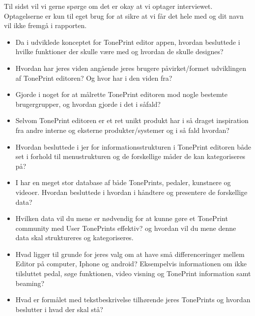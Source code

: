 Til sidst vil vi gerne spørge om det er okay at vi optager interviewet. Optagelserne er kun til eget brug for at sikre at vi får det hele med og dit navn vil ikke fremgå i rapporten.


\begin{itemize}
  \item Da i udviklede konceptet for TonePrint editor appen, hvordan besluttede i hvilke funktioner der skulle være med og hvordan de skulle designes?
  \item Hvordan har jeres viden angående jeres brugere påvirket/formet udviklingen af TonePrint editoren? Og hvor har i den viden fra?
  \item Gjorde i noget for at målrette TonePrint editoren mod nogle bestemte brugergrupper, og hvordan gjorde i det i såfald?
  \item Selvom TonePrint editoren er et ret unikt produkt har i så draget inspiration fra andre interne og eksterne produkter/systemer og i så fald hvordan?
\end{itemize}

\begin{itemize}
  \item Hvordan besluttede i jer for informationsstrukturen i TonePrint editoren både set i forhold til menustrukturen og de forskellige måder de kan kategoriseres på?
  \item I har en meget stor database af både TonePrints, pedaler, kunstnere og videoer. Hvordan besluttede i hvordan i håndtere og presentere de forskellige data?
  \item Hvilken data vil du mene er nødvendig for at kunne gøre et TonePrint community med User TonePrints effektiv? og hvordan vil du mene denne data skal struktureres og kategoriseres.
  \item Hvad ligger til grunde for jeres valg om at have små differenceringer mellem Editor på computer, Iphone og android? Eksempelvis informationen om ikke tilsluttet pedal, søge funktionen, video visning og TonePrint information samt beaming?
  \item Hvad er formålet med tekstbeskrivelse tilhørende jeres TonePrints og hvordan beslutter i hvad der skal stå?
\end{itemize}

